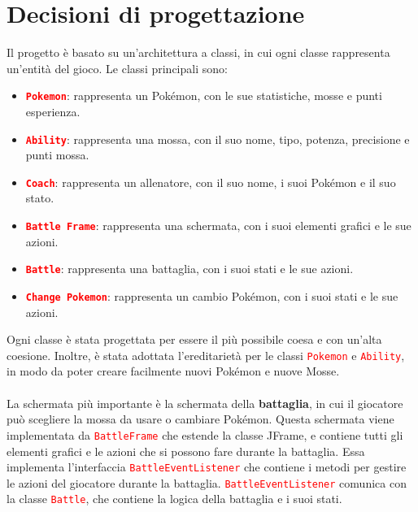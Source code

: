 \documentclass[12pt]{article}
\begin{document}
\newpage
\section{Decisioni di progettazione}
Il progetto è basato su un'architettura a classi, in cui ogni classe rappresenta un'entità del gioco. Le classi principali sono:
\begin{itemize}
    \item \textbf{\texttt{\textcolor{red}{Pokemon}}}: rappresenta un Pokémon, con le sue statistiche, mosse e punti esperienza.
    \item \textbf{\texttt{\textcolor{red}{Ability}}}: rappresenta una mossa, con il suo nome, tipo, potenza, precisione e punti mossa.
    \item \textbf{\texttt{\textcolor{red}{Coach}}}: rappresenta un allenatore, con il suo nome, i suoi Pokémon e il suo stato.
    \item \textbf{\texttt{\textcolor{red}{Battle Frame}}}: rappresenta una schermata, con i suoi elementi grafici e le sue azioni.
    \item \textbf{\texttt{\textcolor{red}{Battle}}}: rappresenta una battaglia, con i suoi stati e le sue azioni.
    \item \textbf{\texttt{\textcolor{red}{Change Pokemon}}}: rappresenta un cambio Pokémon, con i suoi stati e le sue azioni.
\end{itemize}
Ogni classe è stata progettata per essere il più possibile coesa e con un'alta coesione. Inoltre, è stata adottata l'ereditarietà per le classi \texttt{\textcolor{red}{Pokemon}} e \texttt{\textcolor{red}{Ability}}, in modo da poter creare facilmente nuovi Pokémon e nuove Mosse. 
\\ \\
La schermata più importante è la schermata della \textbf{battaglia}, in cui il giocatore può scegliere la mossa da usare o cambiare Pokémon. Questa schermata viene implementata da \texttt{\textcolor{red}{BattleFrame}} che estende la classe JFrame, e contiene tutti gli elementi grafici e le azioni che si possono fare durante la battaglia.
Essa implementa l'interfaccia \texttt{\textcolor{red}{BattleEventListener}} che contiene i metodi per gestire le azioni del giocatore durante la battaglia. \texttt{\textcolor{red}{BattleEventListener}} comunica con la classe \texttt{\textcolor{red}{Battle}}, che contiene la logica della battaglia e i suoi stati.
\\ \\
\end{document}
